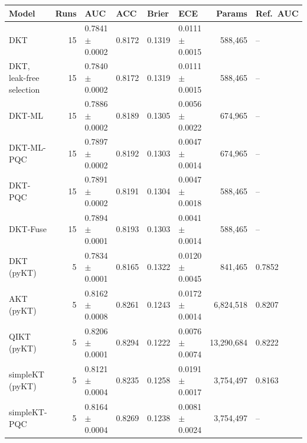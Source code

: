 \begin{tabular}{@{}lrllllrl@{}}
\toprule
Model & Runs & AUC & ACC & Brier & ECE & Params & Ref.\ AUC \\
\midrule
DKT & 15 & 0.7841 $\pm$ 0.0002 & 0.8172 & 0.1319 & 0.0111 $\pm$ 0.0015 & 588,465 & -- \\
DKT, leak-free selection & 15 & 0.7840 $\pm$ 0.0002 & 0.8172 & 0.1319 & 0.0111 $\pm$ 0.0015 & 588,465 & -- \\
DKT-ML & 15 & 0.7886 $\pm$ 0.0002 & 0.8189 & 0.1305 & 0.0056 $\pm$ 0.0022 & 674,965 & -- \\
DKT-ML-PQC & 15 & 0.7897 $\pm$ 0.0002 & 0.8192 & 0.1303 & 0.0047 $\pm$ 0.0014 & 674,965 & -- \\
DKT-PQC & 15 & 0.7891 $\pm$ 0.0002 & 0.8191 & 0.1304 & 0.0047 $\pm$ 0.0018 & 588,465 & -- \\
DKT-Fuse & 15 & 0.7894 $\pm$ 0.0001 & 0.8193 & 0.1303 & 0.0041 $\pm$ 0.0014 & 588,465 & -- \\
\midrule
DKT (pyKT) & 5 & 0.7834 $\pm$ 0.0001 & 0.8165 & 0.1322 & 0.0120 $\pm$ 0.0045 & 841,465 & 0.7852 \\
AKT (pyKT) & 5 & 0.8162 $\pm$ 0.0008 & 0.8261 & 0.1243 & 0.0172 $\pm$ 0.0014 & 6,824,518 & 0.8207 \\
QIKT (pyKT) & 5 & 0.8206 $\pm$ 0.0001 & 0.8294 & 0.1222 & 0.0076 $\pm$ 0.0074 & 13,290,684 & 0.8222 \\
\midrule
simpleKT (pyKT) & 5 & 0.8121 $\pm$ 0.0004 & 0.8235 & 0.1258 & 0.0191 $\pm$ 0.0017 & 3,754,497 & 0.8163 \\
simpleKT-PQC & 5 & 0.8164 $\pm$ 0.0004 & 0.8269 & 0.1238 & 0.0081 $\pm$ 0.0024 & 3,754,497 & -- \\
\bottomrule
\end{tabular}
